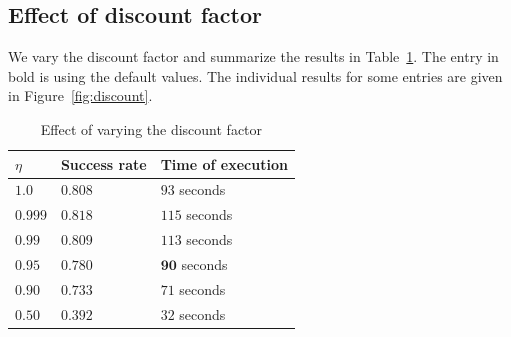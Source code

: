 \documentclass[10pt,a4paper,oneside]{article}
\begin{document}
\subsection{Effect of discount factor}
\label{s:discount}

We vary the discount factor and summarize the results in
Table~\ref{tab:discount}. The entry in bold is using the default values.
The individual results for some entries are given in
Figure~\ref{fig:discount}.

\begin{table}
\begin{center}
\begin{tabular}{|  l | l | l  |}
\hline
  $\eta$ & \textbf{Success rate} & \textbf{Time of execution} \\ \hline \hline
  $1.0$  & $0.808$ & $93$ seconds \\ \hline  %
  $0.999$ & $0.818$ & $115$ seconds \\ \hline  %
  $0.99$ & $0.809$ & $113$ seconds \\ \hline  %
  $\mathbf{0.95}$ & $\mathbf{0.780}$ & $\mathbf{90}$ seconds \\ \hline
  $0.90$ & $0.733$ & $71$ seconds \\ \hline  %
  $0.50$ & $0.392$ & $32$ seconds \\ \hline  %
\end{tabular}
\end{center}
\caption{Effect of varying the discount factor}
\label{tab:discount}
\end{table}

%
%
%
\end{document}
